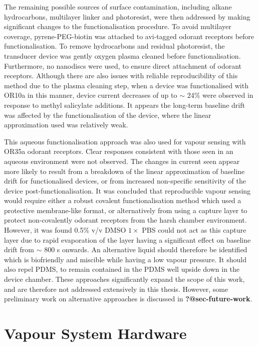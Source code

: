 \documentclass[
  a4paper,
]{scrbook}
\begin{document}
The remaining possible sources of surface contamination, including
alkane hydrocarbons, multilayer linker and photoresist, were then
addressed by making significant changes to the functionalisation
procedure. To avoid multilayer coverage, pyrene-PEG-biotin was attached
to avi-tagged odorant receptors before functionalisation. To remove
hydrocarbons and residual photoresist, the transducer device was gently
oxygen plasma cleaned before functionalisation. Furthermore, no
nanodiscs were used, to ensure direct attachment of odorant receptors.
Although there are also issues with reliable reproducibility of this
method due to the plasma cleaning step, when a device was functionalised
with OR10a in this manner, device current decreases of up to \(\sim\)
24\% were observed in response to methyl salicylate additions. It
appears the long-term baseline drift was affected by the
functionalisation of the device, where the linear approximation used was
relatively weak.

This aqueous functionalisation approach was also used for vapour sensing
with OR35a odorant receptors. Clear responses consistent with those seen
in an aqueous environment were not observed. The changes in current seen
appear more likely to result from a breakdown of the linear
approximation of baseline drift for functionalised devices, or from
increased non-specific sensitivity of the device post-functionalisation.
It was concluded that reproducible vapour sensing would require either a
robust covalent functionalisation method which used a protective
membrane-like format, or alternatively from using a capture layer to
protect non-covalently odorant receptors from the harsh chamber
environment. However, it was found 0.5\% v/v DMSO \(1 \times\) PBS could
not act as this capture layer due to rapid evaporation of the layer
having a significant effect on baseline drift from \(\sim\) 800 s
onwards. An alternative liquid should therefore be identified which is
biofriendly and miscible while having a low vapour pressure. It should
also repel PDMS, to remain contained in the PDMS well upside down in the
device chamber. These approaches significantly expand the scope of this
work, and are therefore not addressed extensively in this thesis.
However, some preliminary work on alternative approaches is discussed in
\textbf{?@sec-future-work}.

\cleardoublepage
{}
{}
\appendix

\hypertarget{sec-vapour-sensor-components}{%
\chapter{Vapour System Hardware}\label{sec-vapour-sensor-components}}
\end{document}
